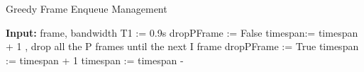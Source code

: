 \begin{algorithm}[tb]
\caption{Greedy Frame Enqueue Management}
\label{alg:greedy-drop}
\begin{algorithmic}[1]
\State \textbf{Input:} {frame, bandwidth}
\State T1 := 0.9s
\State dropPFrame := False
\State {}
\State timespan:= timespan + 1 
\EndIf
{}
\State {}, drop all the P frames until the next I frame
\State dropPFrame := True
\Else
\State {}
\State timespan := timespan + 1
\EndIf
\EndIf
\State timespan := timespan - 
\end{algorithmic}
\end{algorithm}